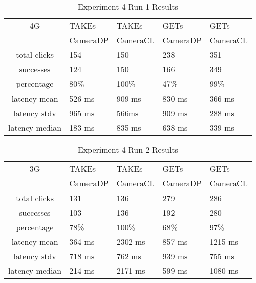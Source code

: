 \begin{table}[htb]
\begin{scriptsize} 
\caption{Experiment 4 Run 1 Results} 
\label{table:exp-4-run1-results}
 \begin{center}
 \begin{tabular}{| c | p{1.5cm} | p{1.5cm} | p{1.5cm} | p{1.4cm} |}
  \hline
  4G & TAKEs & TAKEs & GETs & GETs \\
  & CameraDP & CameraCL & CameraDP & CameraCL \\
  \hline
  total clicks & 154 & 150 & 238 & 351 \\
  \hline
  successes & 124 & 150 & 166 & 349 \\
  \hline
  percentage & 80\% & 100\% & 47\% & 99\% \\
  \hline
  latency mean & 526 ms & 909 ms & 830 ms & 366 ms \\
  \hline
  latency stdv & 965 ms & 566ms & 909 ms & 288 ms \\
  \hline
  latency median & 183 ms & 835 ms & 638 ms & 339 ms \\
  \hline
  \end{tabular}
  \end{center}
\end{scriptsize}
\end{table}

\begin{table}[htb]
\begin{scriptsize} 
\caption{Experiment 4 Run 2 Results} 
\label{table:exp-4-run2-results}
 \begin{center}
 \begin{tabular}{| c | p{1.5cm} | p{1.5cm} | p{1.5cm} | p{1.4cm} |}
  \hline
  3G & TAKEs & TAKEs & GETs & GETs \\
  & CameraDP & CameraCL & CameraDP & CameraCL \\
  \hline
  total clicks & 131 & 136 & 279 & 286 \\
  \hline
  successes & 103 & 136 & 192 & 280 \\
  \hline
  percentage & 78\% & 100\% & 68\% & 97\% \\
  \hline
  latency mean & 364 ms & 2302 ms & 857 ms & 1215 ms \\
  \hline
  latency stdv & 718 ms & 762 ms & 939 ms & 755 ms \\
  \hline
  latency median & 214 ms & 2171 ms & 599 ms & 1080 ms \\
  \hline
  \end{tabular}

  \end{center}
\end{scriptsize}
\end{table}

